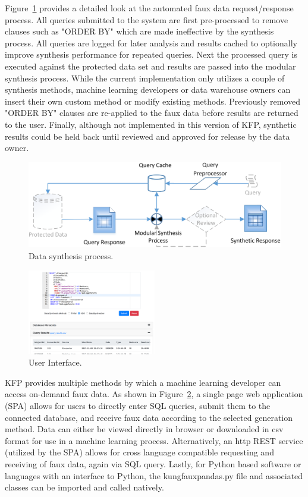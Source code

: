 \documentclass{article}
\begin{document}
Figure~\ref{fig:synthesis_process} provides a detailed look at the automated faux data request/response process. All queries submitted to the system are first pre-processed to remove clauses such as "ORDER BY" which are made ineffective by the synthesis process. All queries are logged for later analysis and results cached to optionally improve synthesis performance for repeated queries. Next the processed query is executed against the protected data set and results are passed into the modular synthesis process. While the current implementation only utilizes a couple of synthesis methods, machine learning developers or data warehouse owners can insert their own custom method or modify existing methods. Previously removed "ORDER BY" clauses are re-applied to the faux data before results are returned to the user. Finally, although not implemented in this version of KFP, synthetic results could be held back until reviewed and approved for release by the data owner.


\begin{figure}[ht]
  \centering
  \includegraphics[width=120mm]{data_synthesis_process}
  \caption{Data synthesis process.}
  \label{fig:synthesis_process}
\end{figure}


\begin{figure}%
  \centering
  \includegraphics[width=0.5\textwidth]{ui_screenshot3}
  \caption{User Interface.}
  \label{fig:ui}
\end{figure}
KFP provides multiple methods by which a machine learning developer can access on-demand faux data. As shown in Figure~\ref{fig:ui}, a single page web application (SPA) allows for users to directly enter SQL queries, submit them to the connected database, and receive faux data according to the selected generation method. Data can either be viewed directly in browser or downloaded in csv format for use in a machine learning process. Alternatively, an http REST service (utilized by the SPA) allows for cross language compatible requesting and receiving of faux data, again via SQL query. Lastly, for Python based software or languages with an interface to Python, the kungfauxpandas.py file and associated classes can be imported and called natively.
\end{document}
